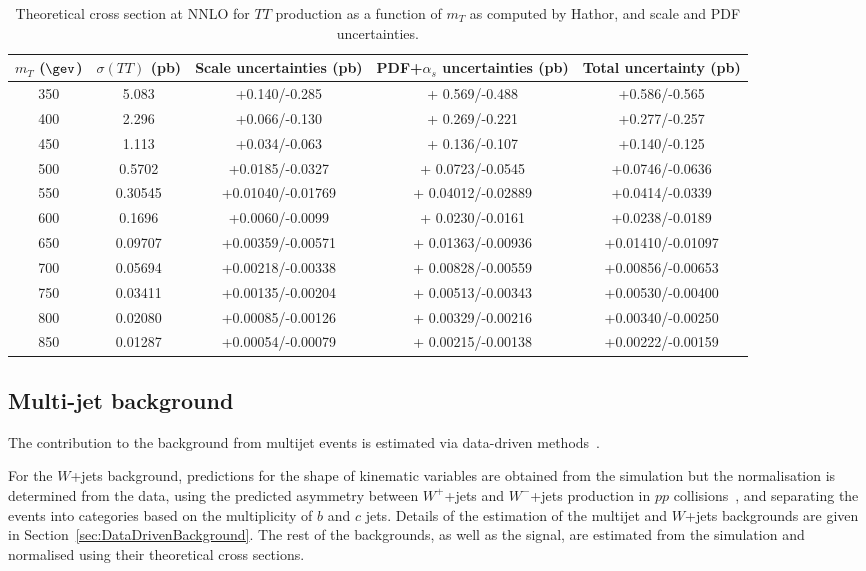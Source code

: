 \begin{table}[h!]
\begin{center}
\begin{tabular}{c c c c c}
\hline
\hline
 $m_{T}$ ($\gev$) & $\sigma(TT)$ (pb) & Scale uncertainties (pb) & PDF+$\alpha_s$ uncertainties (pb) & Total uncertainty (pb)\\
\hline
350 	&  5.083 		&  +0.140/-0.285 		&  + 0.569/-0.488 		&  +0.586/-0.565		\\
400 	&  2.296 		&  +0.066/-0.130 		&  + 0.269/-0.221 		&  +0.277/-0.257		\\
450 	&  1.113 		&  +0.034/-0.063 		&  + 0.136/-0.107 		&  +0.140/-0.125		\\
500 	&  0.5702 		&  +0.0185/-0.0327 		&  + 0.0723/-0.0545	 	&  +0.0746/-0.0636		\\
550 	&  0.30545 	&  +0.01040/-0.01769 	&  + 0.04012/-0.02889 	&  +0.0414/-0.0339		\\
600 	&  0.1696 		&  +0.0060/-0.0099 		&  + 0.0230/-0.0161	 	&  +0.0238/-0.0189		\\	
650 	&  0.09707 	&  +0.00359/-0.00571 	&  + 0.01363/-0.00936 	&  +0.01410/-0.01097	\\
700 	&  0.05694 	&  +0.00218/-0.00338 	&  + 0.00828/-0.00559 	&  +0.00856/-0.00653	\\
750 	&  0.03411 	&  +0.00135/-0.00204 	&  + 0.00513/-0.00343 	&  +0.00530/-0.00400	\\
800 	&  0.02080 	&  +0.00085/-0.00126 	&  + 0.00329/-0.00216 	&  +0.00340/-0.00250	\\
850 	&  0.01287 	&  +0.00054/-0.00079 	&  + 0.00215/-0.00138 	&  +0.00222/-0.00159 	\\
\hline
\hline
\end{tabular}
\caption{\label{tab:sigmaTT} Theoretical cross section at NNLO  for $TT$ production as a function
of $m_{T}$ as computed by {\sc Hathor}, and scale and PDF uncertainties.}
\end{center}
\end{table}

\subsection{Multi-jet background}\label{sec:qcdbkg}

The contribution to the background from multijet events is
estimated via data-driven methods~\cite{ttbar_3pb}.


  For the $W$+jets
background, predictions for the shape of kinematic variables are obtained from the simulation but the
normalisation is determined from the data, using the predicted asymmetry between
$W^+$+jets and $W^-$+jets production in $pp$ collisions~\cite{wasym}, and 
separating the events into categories based on the multiplicity of $b$ and $c$ jets.
Details of the estimation of the multijet and
$W$+jets backgrounds are given in Section~\ref{sec:DataDrivenBackground}.
The rest of the backgrounds, as well as the signal, are estimated from 
the simulation and normalised using their theoretical cross sections. 






